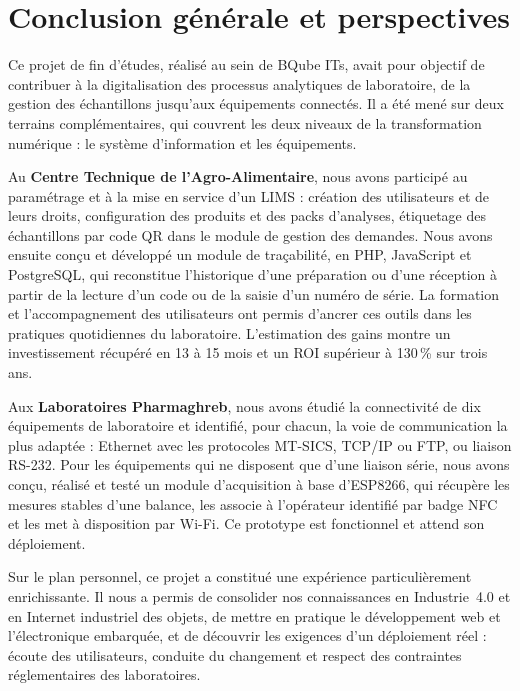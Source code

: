 \chapter*{Conclusion générale et perspectives}

Ce projet de fin d'études, réalisé au sein de BQube ITs, avait pour objectif de contribuer à la digitalisation des processus analytiques de laboratoire, de la gestion des échantillons jusqu'aux équipements connectés. Il a été mené sur deux terrains complémentaires, qui couvrent les deux niveaux de la transformation numérique : le système d'information et les équipements.

Au \textbf{Centre Technique de l'Agro-Alimentaire}, nous avons participé au paramétrage et à la mise en service d'un \ac{LIMS} : création des utilisateurs et de leurs droits, configuration des produits et des packs d'analyses, étiquetage des échantillons par code \ac{QR} dans le module de gestion des demandes. Nous avons ensuite conçu et développé un module de traçabilité, en \ac{PHP}, JavaScript et PostgreSQL, qui reconstitue l'historique d'une préparation ou d'une réception à partir de la lecture d'un code ou de la saisie d'un numéro de série. La formation et l'accompagnement des utilisateurs ont permis d'ancrer ces outils dans les pratiques quotidiennes du laboratoire. L'estimation des gains montre un investissement récupéré en 13 à 15 mois et un \ac{ROI} supérieur à 130\,\% sur trois ans.

Aux \textbf{Laboratoires Pharmaghreb}, nous avons étudié la connectivité de dix équipements de laboratoire et identifié, pour chacun, la voie de communication la plus adaptée : Ethernet avec les protocoles \ac{MT-SICS}, \ac{TCP}/\ac{IP} ou \ac{FTP}, ou liaison \ac{RS-232}. Pour les équipements qui ne disposent que d'une liaison série, nous avons conçu, réalisé et testé un module d'acquisition à base d'ESP8266, qui récupère les mesures stables d'une balance, les associe à l'opérateur identifié par badge \ac{NFC} et les met à disposition par \ac{Wi-Fi}. Ce prototype est fonctionnel et attend son déploiement.

Sur le plan personnel, ce projet a constitué une expérience particulièrement enrichissante. Il nous a permis de consolider nos connaissances en Industrie~4.0 et en Internet industriel des objets, de mettre en pratique le développement web et l'électronique embarquée, et de découvrir les exigences d'un déploiement réel : écoute des utilisateurs, conduite du changement et respect des contraintes réglementaires des laboratoires.


